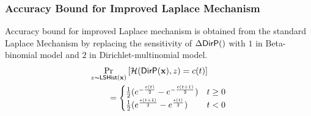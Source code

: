 \documentclass{article}
\begin{document}
\subsubsection{Accuracy Bound for Improved Laplace Mechanism}
\label{subsec_accuracy_lap}
Accuracy bound for improved Laplace mechanism is obtained from the standard Laplace Mechanism by replacing the sensitivity of $\Delta \bysinfer$ with $1$ in Beta-binomial model and $2$ in Dirichlet-multinomial model.
\begin{align*}
&
\underset{ {z \thicksim \mathsf{LSHist}(\textbf{x})} }{\Pr}\left[ 
\mathcal{H}(\mathsf{DirP}(\textbf{x}), z ) = c(t)
 \right]
\\
&\qquad = 
\begin{cases}
\frac{1}{2} (e^{- \frac{\epsilon (t)}{2}} - e^{- \frac{\epsilon (t + 1)}{2}}) &  t \geq 0\\
\frac{1}{2} (e^{\frac{\epsilon (t + 1)}{2}} - e^{\frac{\epsilon (t)}{2}}) & t < 0
\end{cases}
\end{align*}
%
%
%
\end{document}
